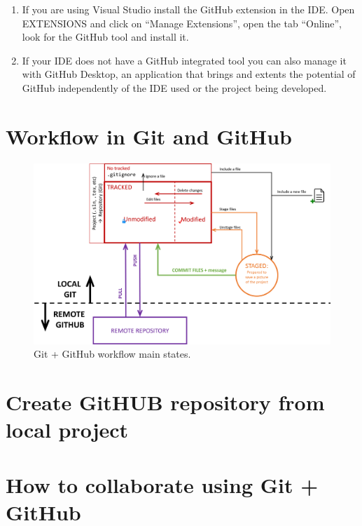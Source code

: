 \begin{enumerate}
    \item If you are using Visual Studio install the GitHub extension in the IDE. Open EXTENSIONS and click on ``Manage Extensions'', open the tab ``Online'', look for the GitHub tool and install it. 
    \item If your IDE does not have a GitHub integrated tool you can also manage it with GitHub Desktop, an application that brings and extents the potential of GitHub independently of the IDE used or the project being developed. 
\end{enumerate}





\newpage 
\section{Workflow in Git and GitHub}
    
      
    
\begin{figure}[h]
    \centering
    \includegraphics[width = 1.2\textwidth]{Figures/GHStates.png}
    \caption{Git + GitHub workflow main states.}
    \label{fig:GitStates}
\end{figure} 
  
\section{Create GitHUB repository from local project}


\section{How to collaborate using Git + GitHub}


